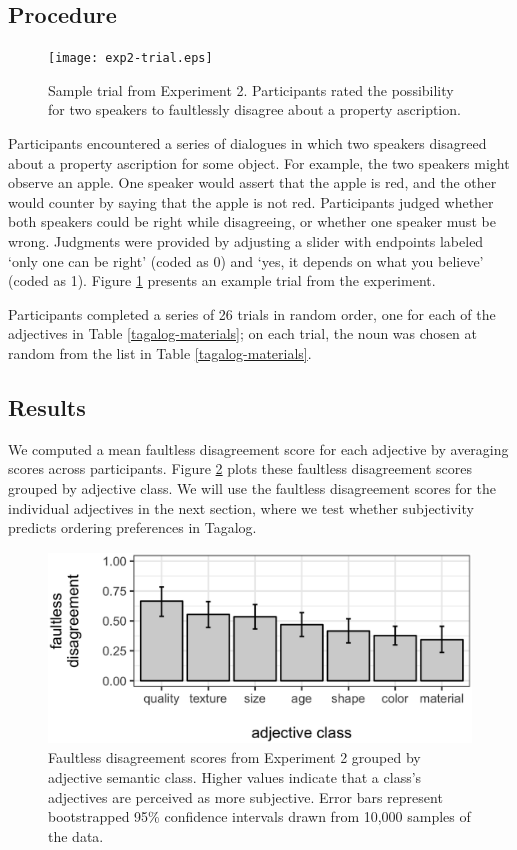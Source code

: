 \documentclass[12pt,letterpaper]{article}
\begin{document}
\subsection{Procedure}

\begin{figure}
\centering
\texttt{[image: exp2-trial.eps]}
\caption{Sample trial from Experiment 2. Participants rated the possibility for two speakers to faultlessly disagree about a property ascription.
}
\label{exp2-trial}
\end{figure}

Participants encountered a series of dialogues in which two speakers disagreed about a property ascription for some object. For example, the two speakers might observe an apple. One speaker would assert that the apple is red, and the other would counter by saying that the apple is not red. Participants judged whether both speakers could be right while disagreeing, or whether one speaker must be wrong. Judgments were provided by adjusting a slider with endpoints labeled `only one can be right' (coded as 0) and `yes, it depends on what you believe' (coded as 1). Figure \ref{exp2-trial} presents an example trial from the experiment.

Participants completed a series of 26 trials in random order, one for each of the adjectives in Table \ref{tagalog-materials}; on each trial, the noun was chosen at random from the list in Table \ref{tagalog-materials}.

\subsection{Results}

We computed a mean faultless disagreement score for each adjective by averaging scores across participants. Figure \ref{exp2-results} plots these faultless disagreement scores grouped by adjective class. We will use the faultless disagreement scores for the individual adjectives in the next section, where we test whether subjectivity predicts ordering preferences in Tagalog.

\begin{figure}[t]
\centering
\includegraphics[height=2in]{class_faultless.eps}
\caption{Faultless disagreement scores from Experiment 2 grouped by adjective semantic class. Higher values indicate that a class's adjectives are perceived as more subjective. Error bars represent bootstrapped 95\% confidence intervals drawn from 10,000 samples of the data.
}
\label{exp2-results}
\end{figure}
\end{document}
